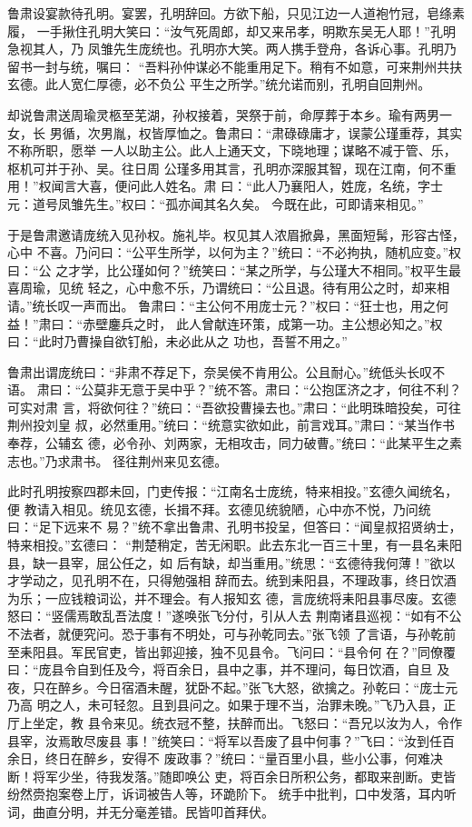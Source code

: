 鲁肃设宴款待孔明。宴罢，孔明辞回。方欲下船，只见江边一人道袍竹冠，皂绦素履，
一手揪住孔明大笑曰：“汝气死周郎，却又来吊孝，明欺东吴无人耶！”孔明急视其人，乃
凤雏先生庞统也。孔明亦大笑。两人携手登舟，各诉心事。孔明乃留书一封与统，嘱曰：
“吾料孙仲谋必不能重用足下。稍有不如意，可来荆州共扶玄德。此人宽仁厚德，必不负公
平生之所学。”统允诺而别，孔明自回荆州。

却说鲁肃送周瑜灵柩至芜湖，孙权接着，哭祭于前，命厚葬于本乡。瑜有两男一女，长
男循，次男胤，权皆厚恤之。鲁肃曰：“肃碌碌庸才，误蒙公瑾重荐，其实不称所职，愿举
一人以助主公。此人上通天文，下晓地理；谋略不减于管、乐，枢机可并于孙、吴。往日周
公瑾多用其言，孔明亦深服其智，现在江南，何不重用！”权闻言大喜，便问此人姓名。肃
曰：“此人乃襄阳人，姓庞，名统，字士元：道号凤雏先生。”权曰：“孤亦闻其名久矣。
今既在此，可即请来相见。”

于是鲁肃邀请庞统入见孙权。施礼毕。权见其人浓眉掀鼻，黑面短髯，形容古怪，心中
不喜。乃问曰：“公平生所学，以何为主？”统曰：“不必拘执，随机应变。”权曰：“公
之才学，比公瑾如何？”统笑曰：“某之所学，与公瑾大不相同。”权平生最喜周瑜，见统
轻之，心中愈不乐，乃谓统曰：“公且退。待有用公之时，却来相请。”统长叹一声而出。
鲁肃曰：“主公何不用庞士元？”权曰：“狂士也，用之何益！”肃曰：“赤壁鏖兵之时，
此人曾献连环策，成第一功。主公想必知之。”权曰：“此时乃曹操自欲钉船，未必此从之
功也，吾誓不用之。”

鲁肃出谓庞统曰：“非肃不荐足下，奈吴侯不肯用公。公且耐心。”统低头长叹不语。
肃曰：“公莫非无意于吴中乎？”统不答。肃曰：“公抱匡济之才，何往不利？可实对肃
言，将欲何往？”统曰：“吾欲投曹操去也。”肃曰：“此明珠暗投矣，可往荆州投刘皇
叔，必然重用。”统曰：“统意实欲如此，前言戏耳。”肃曰：“某当作书奉荐，公辅玄
德，必令孙、刘两家，无相攻击，同力破曹。”统曰：“此某平生之素志也。”乃求肃书。
径往荆州来见玄德。

此时孔明按察四郡未回，门吏传报：“江南名士庞统，特来相投。”玄德久闻统名，便
教请入相见。统见玄德，长揖不拜。玄德见统貌陋，心中亦不悦，乃问统曰：“足下远来不
易？”统不拿出鲁肃、孔明书投呈，但答曰：“闻皇叔招贤纳士，特来相投。”玄德曰：
“荆楚稍定，苦无闲职。此去东北一百三十里，有一县名耒阳县，缺一县宰，屈公任之，如
后有缺，却当重用。”统思：“玄德待我何薄！”欲以才学动之，见孔明不在，只得勉强相
辞而去。统到耒阳县，不理政事，终日饮酒为乐；一应钱粮词讼，并不理会。有人报知玄
德，言庞统将耒阳县事尽废。玄德怒曰：“竖儒焉敢乱吾法度！”遂唤张飞分付，引从人去
荆南诸县巡视：“如有不公不法者，就便究问。恐于事有不明处，可与孙乾同去。”张飞领
了言语，与孙乾前至耒阳县。军民官吏，皆出郭迎接，独不见县令。飞问曰：“县令何
在？”同僚覆曰：“庞县令自到任及今，将百余日，县中之事，并不理问，每日饮酒，自旦
及夜，只在醉乡。今日宿酒未醒，犹卧不起。”张飞大怒，欲擒之。孙乾曰：“庞士元乃高
明之人，未可轻忽。且到县问之。如果于理不当，治罪未晚。”飞乃入县，正厅上坐定，教
县令来见。统衣冠不整，扶醉而出。飞怒曰：“吾兄以汝为人，令作县宰，汝焉敢尽废县
事！”统笑曰：“将军以吾废了县中何事？”飞曰：“汝到任百余日，终日在醉乡，安得不
废政事？”统曰：“量百里小县，些小公事，何难决断！将军少坐，待我发落。”随即唤公
吏，将百余日所积公务，都取来剖断。吏皆纷然赍抱案卷上厅，诉词被告人等，环跪阶下。
统手中批判，口中发落，耳内听词，曲直分明，并无分毫差错。民皆叩首拜伏。

